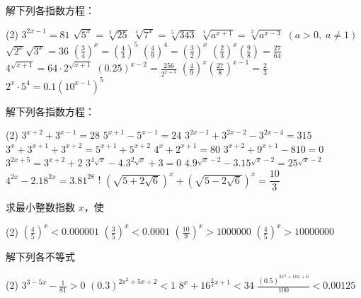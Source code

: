 \begin{Exercise}
\begin{question}
  \item 解下列各指数方程：
  \begin{tasks}(2)
    \task $\displaystyle 3^{2 x-1}=81$
    \task $\displaystyle \sqrt{5^{x}}=\sqrt[3]{25}$
    \task $\displaystyle \sqrt[4]{7^{x}}=\sqrt[5]{343}$
    \task $\displaystyle \sqrt[4]{a^{x+1}}=\sqrt[3]{a^{x-3}}$ $(a>0,\;  a \neq 1)$
    \task $\displaystyle \sqrt{2^{x}} \sqrt{3^{x}}=36$
    \task $\displaystyle \left(\frac{3}{4}\right)^x=\left(\frac{4}{3}\right)^5$
    \task $\displaystyle \left(\frac{4}{9}\right)^{4}=\left(\frac{3}{2}\right)^{x}$
    \task $\displaystyle \left(\frac{2}{3}\right)^{x}\left(\frac{9}{8}\right)=\frac{27}{64}$
    \task $\displaystyle  4^{\sqrt{x+1}}=64 \cdot 2^{\sqrt{x+1}} $
    \task $\displaystyle (0.25)^{x-2}=\frac{256}{2^{x+3}}$
    \task $\displaystyle \left(\frac{4}{9}\right)^{x}\left(\frac{27}{8}\right)^{x-1}=\frac{2}{3}$
    \task $\displaystyle 2^{x} \cdot 5^{4}=0.1\left(10^{x-1}\right)^{5}$
  \end{tasks}
  \item  解下列各指数方程：
  \begin{tasks}(2)
    \task  $3^{x+2}+3^{x-1}=28$
    \task  $5^{x+1}-5^{x-1}=24$
    \task  $3^{2 x-1}+3^{2 x-2}-3^{2 x-4}=315$
    \task  $3^{x}+3^{x+1}+3^{x+2}=5^{x+1}+5^{x+2}$
    \task  $4^{x}+2^{x+1}=80$ 
    \task  $ 3^{x+2}+9^{x+1}-810=0$
    \task  $3^{2 x+5}=3^{x+2}+2$
    \task  $3^{4 \sqrt{x}}-4.3^{2 \sqrt{x}}+3=0$
    \task  $4.9^{\sqrt{x}-2}-3.15^{\sqrt{x}-2}=25^{\sqrt{x}-2} $
    \task  $4^{2 x}-2.18^{2 x}=3.81^{28} $
    \task! $\left(\sqrt{5+2 \sqrt{6}}\right)^{x}+\left(\sqrt{5-2 \sqrt{6}}\right)^{x}=\dfrac{10}{3}$
  \end{tasks}
  \item  求最小整数指数 $x$，使
  \begin{tasks}(2)
    \task $\displaystyle \left(\frac{4}{5}\right)^{x}<0.000001$
    \task $\displaystyle \left(\frac{3}{5}\right)^{x}<0.0001$
    \task $\displaystyle \left(\frac{10}{9}\right)^{x}>1000000$
    \task $\displaystyle \left(\frac{4}{5}\right)^{x}>10000000$
  \end{tasks}
  \item  解下列各不等式
  \begin{tasks}(2)
    \task  $\displaystyle 3^{3-5 x}-\frac{1}{81}>0$
    \task  $\displaystyle (0.3)^{2 x^{2}+5 x+2}<1$
    \task  $\displaystyle 8^{x}+16^{\tfrac{3}{4} x+1}<34$
    \task  $\displaystyle \frac{(0.5)^{3 x^{2}+10 x+6}}{100}<0.00125$

\end{tasks}
\end{question}
\end{Exercise}
